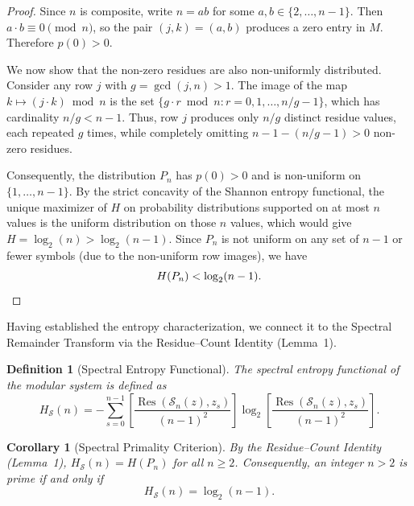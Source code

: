 \documentclass[11pt,twoside]{article}
\newtheorem{definition}{Definition}
\newtheorem{corollary}{Corollary}
\begin{document}
	\begin{proof}
		Since $n$ is composite, write $n = ab$ for some $a, b \in \{2, \dots, n-1\}$. Then $a \cdot b \equiv 0 \pmod{n}$, so the pair $(j, k) = (a, b)$ produces a zero entry in $M$. Therefore $p(0) > 0$.
		
		We now show that the non-zero residues are also non-uniformly distributed. Consider any row $j$ with $g = \gcd(j, n) > 1$. The image of the map $k \mapsto (j \cdot k) \bmod n$ is the set $\{g \cdot r \bmod n : r = 0, 1, \dots, n/g - 1\}$, which has cardinality $n/g < n-1$. Thus, row $j$ produces only $n/g$ distinct residue values, each repeated $g$ times, while completely omitting $n - 1 - (n/g - 1) > 0$ non-zero residues.
		
		Consequently, the distribution $P_n$ has $p(0) > 0$ and is non-uniform on $\{1, \dots, n-1\}$. By the strict concavity of the Shannon entropy functional, the unique maximizer of $H$ on probability distributions supported on at most $n$ values is the uniform distribution on those $n$ values, which would give $H = \log_2(n) > \log_2(n-1)$. Since $P_n$ is not uniform on any set of $n-1$ or fewer symbols (due to the non-uniform row images), we have
		\begin{equation}
			H(P_n) < \log_2(n-1). \qedhere
		\end{equation}
	\end{proof}
	
	Having established the entropy characterization, we connect it to the Spectral Remainder Transform via the Residue--Count Identity (Lemma~1).
	
	\begin{definition}[Spectral Entropy Functional]
		The \emph{spectral entropy functional} of the modular system is defined as
		\begin{equation}
			H_{\mathcal{S}}(n) = -\sum_{s=0}^{n-1} \left[ \frac{\operatorname{Res}(\mathcal{S}_n(z), z_s)}{(n-1)^2} \right] \log_2 \left[ \frac{\operatorname{Res}(\mathcal{S}_n(z), z_s)}{(n-1)^2} \right].
		\end{equation}
	\end{definition}
	
	\begin{corollary}[Spectral Primality Criterion]
		By the Residue--Count Identity (Lemma~1), $H_{\mathcal{S}}(n) = H(P_n)$ for all $n \geq 2$. Consequently, an integer $n > 2$ is prime if and only if
		\begin{equation}
			H_{\mathcal{S}}(n) = \log_2(n-1).
		\end{equation}
	\end{corollary}
	
\end{document}
